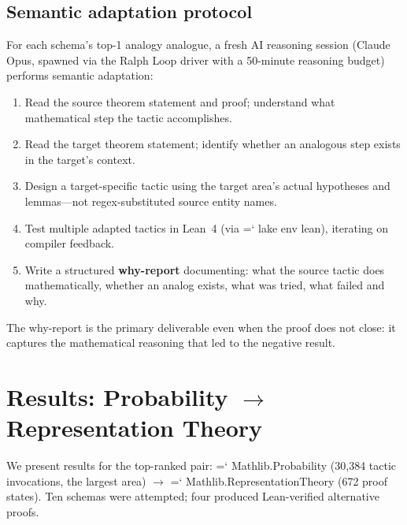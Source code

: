 \documentclass[11pt]{article}
\renewcommand{\texttt}[1]{%
  \begingroup\ttfamily\hyphenchar\font=`\-\relax
  \def\_{\textunderscore\discretionary{}{}{}}%
  #1\endgroup}
\theoremstyle{definition}
\theoremstyle{remark}
\begin{document}
\subsection{Semantic adaptation protocol}

For each schema's top-1 analogy analogue, a fresh AI reasoning session
(Claude Opus, spawned via the Ralph Loop driver with a 50-minute
reasoning budget) performs semantic adaptation:

\begin{enumerate}
\item Read the source theorem statement and proof; understand what
  mathematical step the tactic accomplishes.
\item Read the target theorem statement; identify whether an
  analogous step exists in the target's context.
\item Design a target-specific tactic using the target area's actual
  hypotheses and lemmas---not regex-substituted source entity names.
\item Test multiple adapted tactics in Lean~4 (via \texttt{lake env
  lean}), iterating on compiler feedback.
\item Write a structured \textbf{why-report} documenting: what the
  source tactic does mathematically, whether an analog exists, what
  was tried, what failed and why.
\end{enumerate}

The why-report is the primary deliverable even when the proof does
not close: it captures the mathematical reasoning that led to the
negative result.

\section{Results: Probability $\to$ Representation Theory}\label{sec:results}

We present results for the top-ranked pair: \texttt{Mathlib.Probability}
(30{,}384 tactic invocations, the largest area) $\to$
\texttt{Mathlib.RepresentationTheory} (672 proof states).
Ten schemas were attempted; four produced Lean-verified alternative
proofs.
\end{document}
